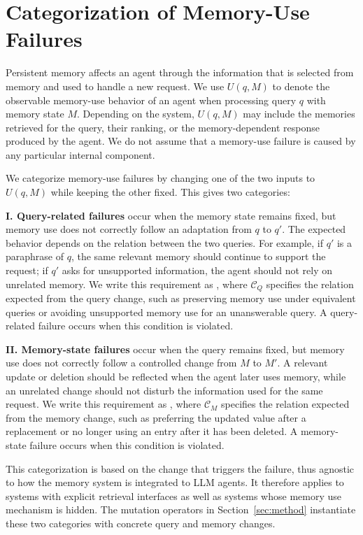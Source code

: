 \section{Categorization of Memory-Use Failures}
\label{sec:problem}

Persistent memory affects an agent through the information that is selected from memory and used to handle a new request. We use
\(
U(q,M)
\)
to denote the observable memory-use behavior of an agent when processing query $q$ with memory state $M$. Depending on the system, $U(q,M)$ may
include the memories retrieved for the query, their ranking, or the
memory-dependent response produced by the agent. We do not assume that a
memory-use failure is caused by any particular internal component.

We categorize memory-use failures by changing one of the two inputs to
$U(q,M)$ while keeping the other fixed. This gives two categories:

\textbf{I. Query-related failures} occur when the memory state remains fixed,
but memory use does not correctly follow an adaptation from $q$ to
$q'$. The expected behavior depends on the relation between the two
queries. For example, if $q'$ is a paraphrase of $q$, the same relevant
memory should continue to support the request; if $q'$ asks for unsupported
information, the agent should not rely on unrelated memory. We write this
requirement as
,
where $\mathcal{C}_Q$ specifies the relation expected from the query
change, such as preserving memory use under equivalent queries or avoiding
unsupported memory use for an unanswerable query. A query-related failure
occurs when this condition is violated.

\textbf{II. Memory-state failures} occur when the query remains fixed, but
memory use does not correctly follow a controlled change from $M$ to
$M'$. A relevant update or deletion should be reflected when the agent later
uses memory, while an unrelated change should not disturb
the information used for the same request. We write this requirement as
,
where $\mathcal{C}_M$ specifies the relation expected from the memory
change, such as preferring the updated value after a replacement or no
longer using an entry after it has been deleted. A memory-state failure
occurs when this condition is violated.

This categorization is based on the change that triggers the failure, thus agnostic to how the memory system is integrated to LLM agents. It therefore applies
to systems with explicit retrieval interfaces as well as systems whose
memory use mechanism is hidden. The mutation operators in
Section~\ref{sec:method} instantiate these two categories with concrete
query and memory changes.
